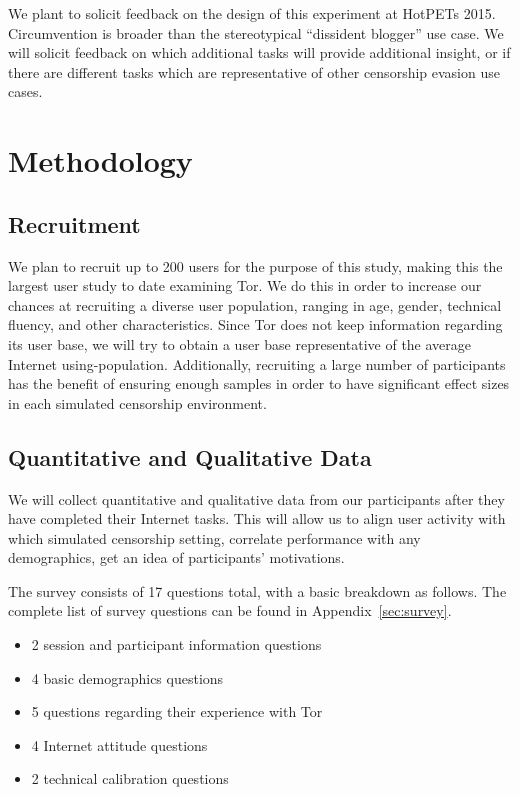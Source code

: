 \documentclass[letterpaper,twocolumn,11pt]{article}
\begin{document}
We plant to solicit feedback on the design of this experiment at HotPETs 2015. 
Circumvention is broader than the stereotypical ``dissident blogger'' 
use case. We will solicit feedback on which additional tasks will provide additional insight,
or if there are different tasks which are representative of other censorship evasion use cases.

\section{Methodology}  

\subsection{Recruitment}  
\indent \indent We plan to recruit up to 200 users for the purpose of this study, making this the largest user 
study to date examining Tor. We do this in order to increase our chances at recruiting a diverse
user population, ranging in age, gender, technical fluency, and other characteristics. Since Tor 
does not keep information regarding its user base, we will try to obtain a user base representative of
the average Internet using-population. Additionally, recruiting a large number of participants has the 
benefit of ensuring enough samples in order to have significant effect sizes in 
each simulated censorship environment. 

\subsection{Quantitative and Qualitative Data}   
\indent \indent We will collect quantitative and qualitative data from our participants after they have completed 
their Internet tasks. This will allow us to align user activity with which simulated censorship setting, 
correlate performance with any demographics, get an idea of participants' motivations. 

The survey consists of 17 questions total, with a basic breakdown as follows. 
The complete list of survey questions can be found in Appendix~\ref{sec:survey}.

\begin{itemize} \itemsep1pt \parskip0pt 
\item 2 session and participant information questions
\item 4 basic demographics questions
\item 5 questions regarding their experience with Tor
\item 4 Internet attitude questions
\item 2 technical calibration questions
\end{itemize}
\end{document}
